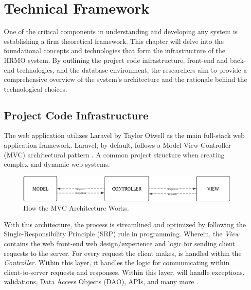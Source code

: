 \chapter{Technical Framework} 

One of the critical components in understanding and developing any system is establishing a firm theoretical framework. This chapter will delve into the foundational concepts and technologies that form the infrastructure of the HRMO system. By outlining the project code infrastructure, front-end and back-end technologies, and the database environment, the researchers aim to provide a comprehensive overview of the system's architecture and the rationale behind the technological choices. 

\section{Project Code Infrastructure}

    The web application utilizes Laravel by Taylor Otwell as the main full-stack web application framework. Laravel, by default, follows a Model-View-Controller (MVC) architectural pattern \cite{medium12023}. A common project structure when creating complex and dynamic web systems. 
    
    \begin{figure}[H]
        \centering
        \includegraphics[width=1\linewidth]{figures/images/doc/mvc.png}
        \caption{How the MVC Architecture Works.}
        \label{fig:enter-label}
    \end{figure}
    
    With this architecture, the process is streamlined and optimized by following the Single-Responsibility Principle (SRP) rule in programming. Wherein, the \textit{View} contains the web front-end web design/experience and logic for sending client requests to the server. For every request the client makes, is handled within the \textit{Controller}. Within this layer, it handles the logic for communicating within client-to-server requests and responses. Within this layer, will handle exceptions, validations, Data Access Objects (DAO), APIs, and many more \cite{mdn12023}.
    

